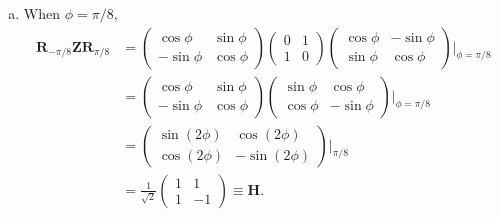 \documentclass{book}
\theoremstyle{definition}
\newcommand{\nn}{\nonumber}
\newcommand{\f}[2]{\frac{#1}{#2}}
\newcommand{\Z}{\mathbf{Z}}
\newcommand{\had}{\mathbf{H}}
\begin{document}
\begin{enumerate}[(a)]
	
	\item When $\phi = \pi/8$,
	\begin{align}
	\mathbf{R}_{-\pi/8}\Z \mathbf{R}_{\pi/8} &= \begin{pmatrix}
	\cos\phi & \sin\phi \\ -\sin\phi & \cos\phi
	\end{pmatrix}\begin{pmatrix}
	0&1\\1&0
	\end{pmatrix}\begin{pmatrix}
	\cos\phi & -\sin\phi \\ \sin\phi & \cos\phi
	\end{pmatrix}\bigg\vert_{\phi = \pi/8}\nn\\
	&= \begin{pmatrix}
	\cos\phi & \sin\phi \\ -\sin\phi & \cos\phi
	\end{pmatrix}\begin{pmatrix}
	\sin\phi & \cos\phi \\ \cos\phi & -\sin\phi
	\end{pmatrix}\bigg\vert_{\phi = \pi/8}\nn\\
	&= \begin{pmatrix}
	\sin(2\phi) &  \cos(2\phi)  \\ \cos(2\phi) & -\sin(2\phi)
	\end{pmatrix}\bigg\vert_{\pi/8}\nn\\
	&= \f{1}{\sqrt{2}}\begin{pmatrix}
	1 & 1 \\ 1 & -1
	\end{pmatrix} \equiv \had.
	\end{align}
\end{enumerate}
\end{document}
